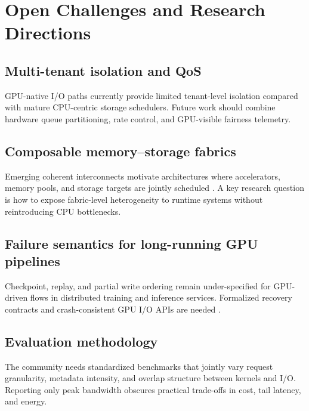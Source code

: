 \section{Open Challenges and Research Directions}

\subsection{Multi-tenant isolation and QoS}

GPU-native I/O paths currently provide limited tenant-level isolation compared with mature CPU-centric storage schedulers. Future work should combine hardware queue partitioning, rate control, and GPU-visible fairness telemetry.

\subsection{Composable memory--storage fabrics}

Emerging coherent interconnects motivate architectures where accelerators, memory pools, and storage targets are jointly scheduled \cite{cxl_spec}. A key research question is how to expose fabric-level heterogeneity to runtime systems without reintroducing CPU bottlenecks.

\subsection{Failure semantics for long-running GPU pipelines}

Checkpoint, replay, and partial write ordering remain under-specified for GPU-driven flows in distributed training and inference services. Formalized recovery contracts and crash-consistent GPU I/O APIs are needed \cite{geminifs2025}.

\subsection{Evaluation methodology}

The community needs standardized benchmarks that jointly vary request granularity, metadata intensity, and overlap structure between kernels and I/O. Reporting only peak bandwidth obscures practical trade-offs in cost, tail latency, and energy.
